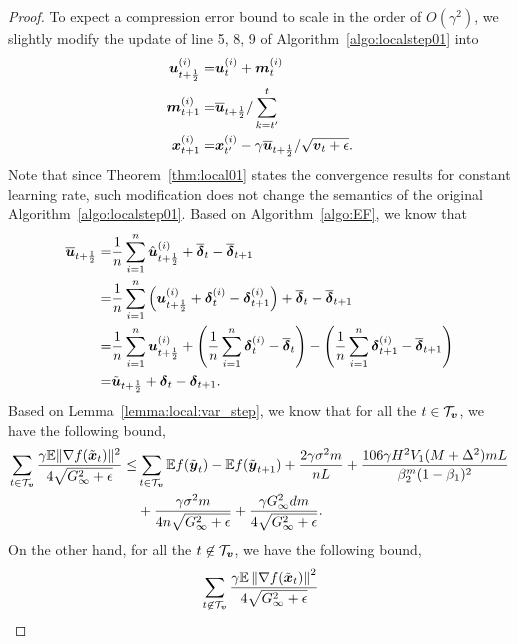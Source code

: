 \begin{proof}
To expect a compression error bound to scale in the order of $O(\gamma^2)$, we slightly modify the update of line 5, 8, 9 of Algorithm~\ref{algo:localstep01} into
\begin{align*}
\boldsymbol{u}^{(i)}_{t+\frac{1}{2}} = & \boldsymbol{u}^{(i)}_{t} + {\boldsymbol{m}}^{(i)}_t \\
\boldsymbol{m}^{(i)}_{t+1} = & \overline{\boldsymbol{u}}_{t+\frac{1}{2}}/\sum_{k=t'}^{t} \\
    \boldsymbol{x}^{(i)}_{t+1} = & \boldsymbol{x}^{(i)}_{t'} - \gamma\overline{\boldsymbol{u}}_{t+\frac{1}{2}}/\sqrt{\boldsymbol{v}_t+\epsilon}.
\end{align*}
Note that since Theorem~\ref{thm:local01} states the convergence results for constant learning rate, such modification does not change the semantics of the original Algorithm~\ref{algo:localstep01}.
Based on Algorithm~\ref{algo:EF}, we know that
\begin{align*}
    \overline{\boldsymbol{u}}_{t+\frac{1}{2}} = & \frac{1}{n}\sum_{i=1}^{n}\hat{\boldsymbol{u}}^{(i)}_{t+\frac{1}{2}} + \overline{\boldsymbol{\delta}}_{t} - \overline{\boldsymbol{\delta}}_{t+1} \\
        = & \frac{1}{n}\sum_{i=1}^{n}\left( \boldsymbol{u}^{(i)}_{t+\frac{1}{2}} + \boldsymbol{\delta}^{(i)}_{t} - \boldsymbol{\delta}^{(i)}_{t+1} \right) + \overline{\boldsymbol{\delta}}_{t} - \overline{\boldsymbol{\delta}}_{t+1} \\
    = & \frac{1}{n}\sum_{i=1}^{n}\boldsymbol{u}^{(i)}_{t+\frac{1}{2}} + \left( \frac{1}{n}\sum_{i=1}^{n}\boldsymbol{\delta}^{(i)}_{t} - \overline{\boldsymbol{\delta}}_{t}\right) - \left( \frac{1}{n}\sum_{i=1}^{n}\boldsymbol{\delta}^{(i)}_{t+1} - \overline{\boldsymbol{\delta}}_{t+1}\right) \\
        = & \tilde{\boldsymbol{u}}_{t+\frac{1}{2}} + \boldsymbol{\delta}_{t} - \boldsymbol{\delta}_{t+1}.
\end{align*}
Based on Lemma~\ref{lemma:local:var_step}, we know that for all the $t\in\mathcal{T}_{\boldsymbol{v}}$, we have the following bound, 
\begin{align*}
    \sum_{t\in\mathcal{T}_{\boldsymbol{v}}}\frac{\gamma\mathbb{E}\|\nabla f(\tilde{\boldsymbol{x}}_t)\|^2}{4\sqrt{G_\infty^2+\epsilon}} \leq & \sum_{t\in\mathcal{T}_{\boldsymbol{v}}}\mathbb E f(\tilde{\boldsymbol{y}}_{t}) - \mathbb Ef(\tilde{\boldsymbol{y}}_{t+1}) + \frac{2\gamma\sigma^2m}{nL} +  \frac{106\gamma H^2V_1(M+\Delta^2)mL}{\beta_2^m(1-\beta_1)^2} \\
& + \frac{\gamma\sigma^2m}{4n\sqrt{G_\infty^2+\epsilon}} + \frac{\gamma G_\infty^2dm}{4\sqrt{G_\infty^2+\epsilon}}.
\end{align*}
On the other hand, for all the $t\not\in\mathcal{T}_{\boldsymbol{v}}$, we have the following bound,
\begin{align*}
    & \sum_{t\not\in\mathcal{T}_{\*v}}\frac{\gamma\mathbb E\left\| \nabla f(\tilde{\*{x}}_t) \right\|^2}{4\sqrt{G_\infty^2+\epsilon}} \\

\end{align*}
\end{proof}
